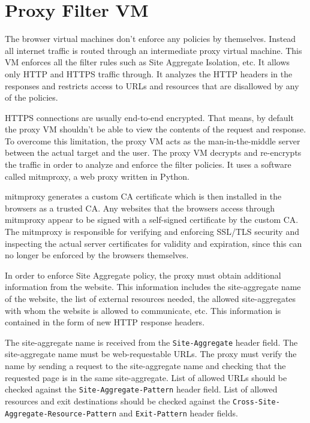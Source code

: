 \section{Proxy Filter VM}

The browser virtual machines don't enforce any policies by themselves. Instead all internet traffic is routed through an intermediate proxy virtual machine. This VM enforces all the filter rules such as Site Aggregate Isolation, etc. It allows only HTTP and HTTPS traffic through. It analyzes the HTTP headers in the responses and restricts access to URLs and resources that are disallowed by any of the policies.

HTTPS connections are usually end-to-end encrypted. That means, by default the proxy VM shouldn't be able to view the contents of the request and response. To overcome this limitation, the proxy VM acts as the man-in-the-middle server between the actual target and the user. The proxy VM decrypts and re-encrypts the traffic in order to analyze and enforce the filter policies. It uses a software called mitmproxy, a web proxy written in Python.

mitmproxy generates a custom CA certificate which is then installed in the browsers as a trusted CA. Any websites that the browsers access through mitmproxy appear to be signed with a self-signed certificate by the custom CA. The mitmproxy is responsible for verifying and enforcing SSL/TLS security and inspecting the actual server certificates for validity and expiration, since this can no longer be enforced by the browsers themselves.

In order to enforce Site Aggregate policy, the proxy must obtain additional information from the website. This information includes the site-aggregate name of the website, the list of external resources needed, the allowed site-aggregates with whom the website is allowed to communicate, etc. This information is contained in the form of new HTTP response headers.

The site-aggregate name is received from the {\tt Site-Aggregate} header field. The site-aggregate name must be web-requestable URLs. The proxy must verify the name by sending a request to the site-aggregate name and checking that the requested page is in the same site-aggregate.
List of allowed URLs should be checked against the {\tt Site-Aggregate-Pattern} header field. List of allowed resources and exit destinations should be checked against the {\tt Cross-Site-Aggregate-Resource-Pattern} and {\tt Exit-Pattern} header fields.

